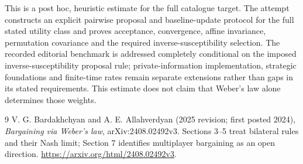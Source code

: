 \documentclass[11pt]{article}
\theoremstyle{remark}\newtheorem{remark}[theorem]{Remark}
\begin{document}
This is a post hoc, heuristic estimate for the full catalogue target.
The attempt constructs an explicit pairwise proposal and baseline-update protocol for the full stated utility class and proves acceptance, convergence, affine invariance, permutation covariance and the required inverse-susceptibility selection. The recorded editorial benchmark is addressed completely conditional on the imposed inverse-susceptibility proposal rule; private-information implementation, strategic foundations and finite-time rates remain separate extensions rather than gaps in its stated requirements. This estimate does not claim that Weber's law alone determines those weights.

\begin{thebibliography}{9}
 V. G. Bardakhchyan and A. E. Allahverdyan (2025 revision; first posted 2024), \emph{Bargaining via Weber's law}, arXiv:2408.02492v3. Sections 3--5 treat bilateral rules and their Nash limit; Section 7 identifies multiplayer bargaining as an open direction. \url{https://arxiv.org/html/2408.02492v3}.
\end{thebibliography}
\end{document}
